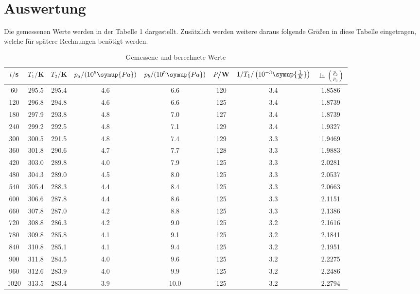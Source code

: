 \section{Auswertung}
\label{sec:Auswertung}

Die gemessenen Werte werden in der Tabelle  1 dargestellt. Zusätzlich werden weitere
daraus folgende Größen in diese Tabelle eingetragen, welche für spätere Rechnungen
benötigt werden.
\begin{table}[H]
  \centering
  \caption{Gemessene und berechnete Werte}
  \label{tab:Werte}
  \begin{tabular}{c c c c c c c c}
    \toprule
    $t/$s & $T_1/$K & $T_2/$K & $p_a/(10^{5}\symup{Pa})$ & $p_b/(10^{5}\symup{Pa})$ &
    $P$/W & $1/T_1/\left(10^{-3}\symup{\frac{1}{K}}\right)$ & $\ln\left(\frac{p_b}{p_0}\right)$ \\
    \midrule
      60  &  295.5 &  295.4 & 4.6  &  6.6 & 120 & 3.4 & 1.8586 \\
     120  &  296.8 &  294.8 & 4.6  &  6.6 & 125 & 3.4 & 1.8739 \\
     180  &  297.9 &  293.8 & 4.8  &  7.0 & 127 & 3.4 & 1.8739 \\
     240  &  299.2 &  292.5 & 4.8  &  7.1 & 129 & 3.4 & 1.9327 \\
     300  &  300.5 &  291.5 & 4.8  &  7.4 & 129 & 3.3 & 1.9469 \\
     360  &  301.8 &  290.6 & 4.7  &  7.7 & 128 & 3.3 & 1.9883 \\
     420  &  303.0 &  289.8 & 4.0  &  7.9 & 125 & 3.3 & 2.0281 \\
     480  &  304.3 &  289.0 & 4.5  &  8.0 & 125 & 3.3 & 2.0537 \\
     540  &  305.4 &  288.3 & 4.4  &  8.4 & 125 & 3.3 & 2.0663 \\
     600  &  306.6 &  287.8 & 4.4  &  8.6 & 125 & 3.3 & 2.1151 \\
     660  &  307.8 &  287.0 & 4.2  &  8.8 & 125 & 3.3 & 2.1386 \\
     720  &  308.8 &  286.3 & 4.2  &  9.0 & 125 & 3.2 & 2.1616 \\
     780  &  309.8 &  285.8 & 4.1  &  9.1 & 125 & 3.2 & 2.1841 \\
     840  &  310.8 &  285.1 & 4.1  &  9.4 & 125 & 3.2 & 2.1951 \\
     900  &  311.8 &  284.5 & 4.0  &  9.6 & 125 & 3.2 & 2.2275 \\
     960  &  312.6 &  283.9 & 4.0  &  9.9 & 125 & 3.2 & 2.2486 \\
    1020  &  313.5 &  283.4 & 3.9  & 10.0 & 125 & 3.2 & 2.2794 \\

\end{tabular}
\end{table}
